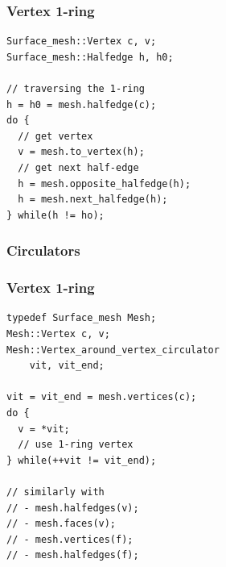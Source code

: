 \begin{frame}[fragile]
\frametitle{Vertex 1-ring}
\begin{lstlisting}
Surface_mesh::Vertex c, v;
Surface_mesh::Halfedge h, h0;

// traversing the 1-ring
h = h0 = mesh.halfedge(c);
do {
  // get vertex
  v = mesh.to_vertex(h);
  // get next half-edge
  h = mesh.opposite_halfedge(h);
  h = mesh.next_halfedge(h);
} while(h != ho);
\end{lstlisting}
\end{frame}

\begin{frame}
\frametitle{Circulators}
\end{frame}

\begin{frame}[fragile]
\frametitle{Vertex 1-ring}
\begin{lstlisting}
typedef Surface_mesh Mesh;
Mesh::Vertex c, v;
Mesh::Vertex_around_vertex_circulator 
    vit, vit_end;

vit = vit_end = mesh.vertices(c);
do {
  v = *vit;
  // use 1-ring vertex
} while(++vit != vit_end);

// similarly with
// - mesh.halfedges(v);
// - mesh.faces(v);
// - mesh.vertices(f);
// - mesh.halfedges(f);
\end{lstlisting}
\end{frame}
